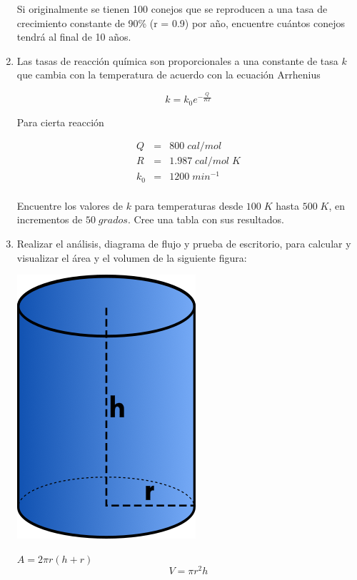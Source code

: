 \documentclass{scrartcl}
\begin{document}
\begin{enumerate}
		Si originalmente se tienen 100 conejos que se reproducen a una tasa de crecimiento constante de 90\% (r = 0.9) por año, encuentre cuántos conejos tendrá al final de 10 años.
		
		\item Las tasas de reacción química son proporcionales a una constante de tasa $k$ que cambia con la temperatura de acuerdo con la ecuación Arrhenius
		
		\begin{equation*}
			k = k_{0} e^{-\frac{Q}{RT}}
		\end{equation*}
	
		Para cierta reacción
		
		\begin{eqnarray*}
			Q  &=&	800\;cal/mol \\
			R  &=&  1.987\;cal/mol\;K \\
			k_{0} &=& 1200\;min^{-1} \\
		\end{eqnarray*}
	
		Encuentre los valores de $k$ para temperaturas desde $100\;K$ hasta $500\;K$, en incrementos de $50\;grados$. Cree una tabla con sus resultados.
		
		\item Realizar el análisis, diagrama de flujo y prueba de escritorio, para calcular y visualizar el área y el volumen de la siguiente figura:
		
			\begin{minipage}{0.4\textwidth}
					\centering
					\includegraphics[scale=0.3]{img/cilindro.png}
			\end{minipage}
			\begin{minipage}{0.5\textwidth}
				\centering
				$A=2 \pi r(h+r)$
				$$V=\pi r^{2} h$$
			\end{minipage}
		

\end{enumerate}
\end{document}
